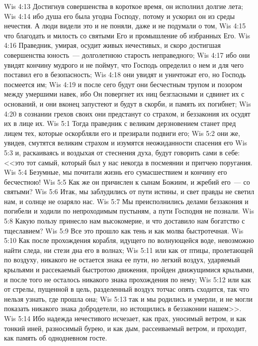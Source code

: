 \vs Wis 4:13 Достигнув совершенства в короткое время, он исполнил долгие лета;
\vs Wis 4:14 ибо душа его была угодна Господу, потому и ускорил он из среды нечестия. А люди видели это и не поняли, даже и не подумали о том,
\vs Wis 4:15 что благодать и милость со святыми Его и промышление об избранных Его.
\vs Wis 4:16 Праведник, умирая, осудит живых нечестивых, и скоро достигшая совершенства юность~--- долголетнюю старость неправедного;
\vs Wis 4:17 ибо они увидят кончину мудрого и не поймут, что Господь определил о нем и для чего поставил его в безопасность;
\vs Wis 4:18 они увидят и уничтожат его, но Господь посмеется им;
\vs Wis 4:19 и после сего будут они бесчестным трупом и позором между умершими навек, ибо Он повергнет их ниц безгласными и сдвинет их с оснований, и они вконец запустеют и будут в скорби, и память их погибнет;
\vs Wis 4:20 в сознании грехов своих они предстанут со страхом, и беззакония их осудят их в лице их.
\vs Wis 5:1 Тогда праведник с великим дерзновением станет пред лицем тех, которые оскорбляли его и презирали подвиги его;
\vs Wis 5:2 они же, увидев, смутятся великим страхом и изумятся неожиданности спасения его
\vs Wis 5:3 и, раскаиваясь и воздыхая от стеснения духа, будут говорить сами в себе: <<это тот самый, который был у нас некогда в посмеянии и притчею поругания.
\vs Wis 5:4 Безумные, мы почитали жизнь его сумасшествием и кончину его бесчестною!
\vs Wis 5:5 Как же он причислен к сынам Божиим, и жребий его~--- со святыми?
\vs Wis 5:6 Итак, мы заблудились от пути истины, и свет правды не светил нам, и солнце не озаряло нас.
\vs Wis 5:7 Мы преисполнились делами беззакония и погибели и ходили по непроходимым пустыням, а пути Господня не познали.
\vs Wis 5:8 Какую пользу принесло нам высокомерие, и что доставило нам богатство с тщеславием?
\vs Wis 5:9 Все это прошло как тень и как молва быстротечная.
\vs Wis 5:10 Как после прохождения корабля, идущего по волнующейся воде, невозможно найти следа, ни стези дна его в волнах;
\vs Wis 5:11 или как от птицы, пролетающей по воздуху, никакого не остается знака ее пути, но легкий воздух, ударяемый крыльями и рассекаемый быстротою движения, пройден движущимися крыльями, и после того не осталось никакого знака прохождения по нему;
\vs Wis 5:12 или как от стрелы, пущенной в цель, разделенный воздух тотчас опять сходится, так что нельзя узнать, где прошла она;
\vs Wis 5:13 так и мы родились и умерли, и не могли показать никакого знака добродетели, но истощились в беззаконии нашем>>.
\vs Wis 5:14 Ибо надежда нечестивого исчезает, как прах, уносимый ветром, и как тонкий иней, разносимый бурею, и как дым, рассеиваемый ветром, и проходит, как память об однодневном госте.
